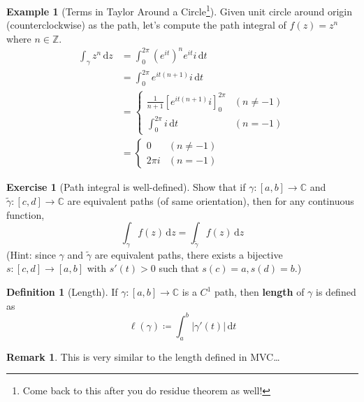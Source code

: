 \documentclass[a4paper, 12pt]{article}
\theoremstyle{definition}
\newtheorem{definition}{Definition}
\newtheorem{exercise}{Exercise}
\newtheorem{example}{Example}
\newtheorem{remark}{Remark}
\numberwithin{theorem}{section}
\numberwithin{definition}{section}
\numberwithin{exercise}{section}
\numberwithin{remark}{section}
\numberwithin{figure}{section}
\numberwithin{example}{section}
\newcommand{\C}{\mathbb{C}}
\newcommand{\intd}{\,\text{d}}
\begin{document}
\begin{example}[Terms in Taylor Around a Circle\footnote{Come back to this after you do residue theorem as well!}]
    \label{eg: Taylor Term Circle Integral}
    Given unit circle around origin (counterclockwise) as the path,
    let's compute the path integral of $f(z) = z^n$ where $n \in \mathbb{Z}$.
    \begin{align*}
        \int_{\gamma} z^n \intd z &= 
        \int_{0}^{2\pi} \left( e^{it} \right)^n e^{it}i \intd t \\
        &= \int_{0}^{2\pi} e^{it\left( n+1 \right)}i \intd t \\
        &= 
        \begin{cases}
            \frac{1}{n+1} \left[ e^{it(n+1)}i \right]_{0}^{2\pi} & (n\neq -1) \\
            \int_{0}^{2\pi} i \intd t & (n = -1)
        \end{cases}
        \\
        &=
        \begin{cases}
            0 & (n \neq -1) \\
            2\pi i & \left( n = -1 \right)
        \end{cases}
    \end{align*}
\end{example}
\begin{exercise}[Path integral is well-defined]
    Show that if $\gamma:[a,b]\rightarrow \C$ and $\tilde\gamma:[c,d] \rightarrow \C$ are equivalent paths (of same orientation),
    then for any continuous function,
    \begin{equation*}
        \int_{\gamma} f(z) \intd z = \int_{\tilde\gamma} f(z) \intd z
    \end{equation*}
    (Hint: since $\gamma$ and $\tilde\gamma$ are equivalent paths,
        there exists a bijective $s:[c,d] \rightarrow [a,b]$ with
    $s'(t) > 0$ such that $s(c) = a, s(d) = b$.)
\end{exercise}
\begin{definition}[Length]
    If $\gamma:[a,b] \rightarrow \C$ is a $C^1$ path, then \textbf{length} of $\gamma$ is defined as
    \begin{equation*}
        \ell \left( \gamma \right) \coloneqq \int_{a}^b |\gamma'(t)| \intd t
    \end{equation*}
\end{definition}
\begin{remark}
    This is very similar to the length defined in MVC\dots
\end{remark}
\end{document}

